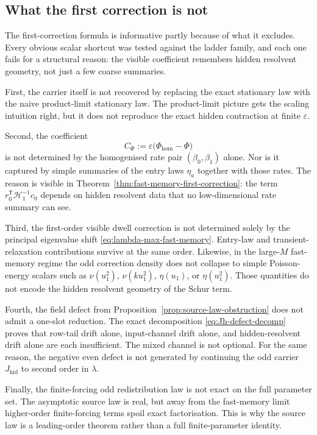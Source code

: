 \documentclass[11pt]{article}
\numberwithin{equation}{section}
\newcommand{\eps}{\varepsilon}
\theoremstyle{thmcompact}
\theoremstyle{remark}
\begin{document}
\subsection{What the first correction is not}

The first-correction formula is informative partly because of what it excludes. Every obvious scalar shortcut was tested against the ladder family, and each one fails for a structural reason: the visible coefficient remembers hidden resolvent geometry, not just a few coarse summaries.

First, the carrier itself is not recovered by replacing the exact stationary law with the naive product-limit stationary law. The product-limit picture gets the scaling intuition right, but it does not reproduce the exact hidden contraction at finite $\eps$.

Second, the coefficient
\begin{equation}\label{eq:Cphi-def}
C_\Phi:=\eps\bigl(\Phi_{\mathrm{hom}}-\Phi\bigr)
\end{equation}
is not determined by the homogenised rate pair $(\beta_0,\beta_1)$ alone. Nor is it captured by simple summaries of the entry laws $\eta_a$ together with those rates. The reason is visible in Theorem~\ref{thm:fast-memory-first-correction}: the term $r_0^{\mathsf T}\mathcal H_1^{-1}c_0$ depends on hidden resolvent data that no low-dimensional rate summary can see.

Third, the first-order visible dwell correction is not determined solely by the principal eigenvalue shift \eqref{eq:lambda-max-fast-memory}. Entry-law and transient-relaxation contributions survive at the same order. Likewise, in the large-$M$ fast-memory regime the odd correction density does not collapse to simple Poisson-energy scalars such as $\nu(u_1^2)$, $\nu(k u_1^2)$, $\eta(u_1)$, or $\eta(u_1^2)$. Those quantities do not encode the hidden resolvent geometry of the Schur term.

Fourth, the field defect from Proposition~\ref{prop:source-law-obstruction} does not admit a one-slot reduction. The exact decomposition \eqref{eq:Jh-defect-decomp} proves that row-tail drift alone, input-channel drift alone, and hidden-resolvent drift alone are each insufficient. The mixed channel is not optional. For the same reason, the negative even defect is not generated by continuing the odd carrier $J_{\mathrm{hid}}$ to second order in $\lambda$.

Finally, the finite-forcing odd redistribution law is not exact on the full parameter set. The asymptotic source law is real, but away from the fast-memory limit higher-order finite-forcing terms spoil exact factorisation. This is why the source law is a leading-order theorem rather than a full finite-parameter identity.
\end{document}
